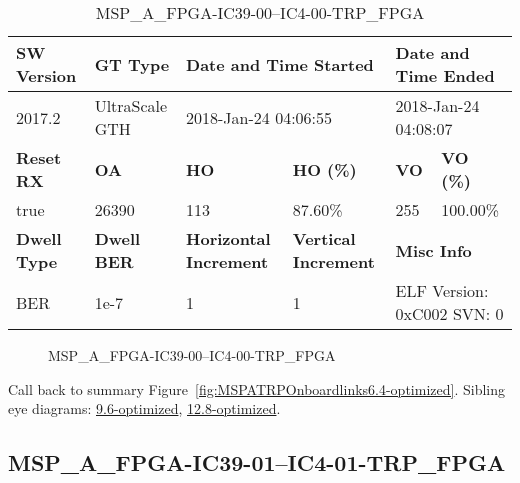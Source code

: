 \begin{table}[h]
\centering
\caption{MSP\_A\_FPGA-IC39-00--IC4-00-TRP\_FPGA}
\label{tab:MSPAFPGAIC3900IC400TRPFPGA6.4-optimized}
\begin{tabular}{@{}|l|l|l|l|l|l|@{}}
\toprule
\textbf{SW Version}                & \textbf{GT Type}   & \multicolumn{2}{l|}{\textbf{Date and Time Started}}            & \multicolumn{2}{l|}{\textbf{Date and Time Ended}}        \\ \midrule
2017.2                       & UltraScale GTH          & \multicolumn{2}{l|}{2018-Jan-24 04:06:55}                   & \multicolumn{2}{l|}{2018-Jan-24 04:08:07}               \\ \midrule
\textbf{Reset RX}                  & \textbf{OA} & \textbf{HO}   & \textbf{HO (\%)} & \textbf{VO} & \textbf{VO (\%)} \\ \midrule
true & 26390        & 113          & 87.60\%        & 255        & 100.00\%       \\ \midrule
\textbf{Dwell Type}                & \textbf{Dwell BER} & \textbf{Horizontal Increment} & \textbf{Vertical Increment}    & \multicolumn{2}{l|}{\textbf{Misc Info}}                  \\ \midrule
BER                            & 1e-7        & 1        & 1           & \multicolumn{2}{l|}{ELF Version: 0xC002 SVN: 0}                         \\ \bottomrule
\end{tabular}
\end{table}

\begin{figure}[h]
\caption{MSP\_A\_FPGA-IC39-00--IC4-00-TRP\_FPGA} \label{fig:MSPAFPGAIC3900IC400TRPFPGA6.4-optimized}
\end{figure}

Call back to summary Figure~\ref{fig:MSPATRPOnboardlinks6.4-optimized}.
Sibling eye diagrams: \hyperref[sec:MSPAFPGAIC3900IC400TRPFPGA9.6-optimized]{9.6-optimized}, \hyperref[sec:MSPAFPGAIC3900IC400TRPFPGA12.8-optimized]{12.8-optimized}.

\clearpage
\newpage


\subsection{MSP\_A\_FPGA-IC39-01--IC4-01-TRP\_FPGA}\label{sec:MSPAFPGAIC3901IC401TRPFPGA6.4-optimized}

